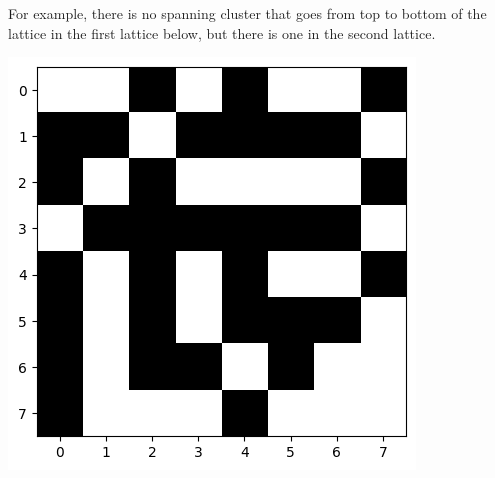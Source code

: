 \documentclass[compress]{beamer}
\begin{document}
\begin{frame} 

    \begin{minipage}{.3\linewidth}
        For example, there is no spanning cluster that goes from top to bottom of the
        lattice in the first lattice below, but there is one in the second lattice.
    \end{minipage}\hfill%
    \begin{minipage}{.3\linewidth}
        \begin{center}
            \includegraphics[width=\linewidth]{spanning1.png}
        \end{center}
    \end{minipage}\hfill%
    \begin{minipage}{.3\linewidth}
        \begin{center}

\end{center}
\end{minipage}
\end{frame}
\end{document}
